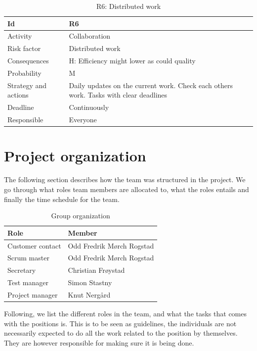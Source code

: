 \documentclass[11pt]{book}
\begin{document}
\begin{table}[H]
\centering
\begin{tabular}{ l  p{11cm} }
	Id						& R6 																		\\ \hline
	Activity				& Collaboration																		\\ \hline
	Risk factor				& Distributed work 															\\ \hline
	Consequences			& H: Efficiency might lower as could quality 								\\ \hline
	Probability				& M 																		\\ \hline
	Strategy and actions	& Daily updates on the current work. Check each others work. Tasks with 
								clear deadlines 														\\ \hline
	Deadline				& Continuously 																\\ \hline
	Responsible				& Everyone 																	\\ 
\end{tabular}
\label{tab:risk_6}
\caption{R6: Distributed work}
\end{table}

\section{Project organization}
The following section describes how the team was structured in the project. We go through what roles team members are allocated to, what the roles entails and finally the time schedule for the team.

\begin{table}[H]
\centering
	\begin{tabular}{ l  p{11cm}  } 	Role 				& Member 					\\ \hline
	Customer contact	& Odd Fredrik Mørch Rogstad \\ \hline
	Scrum master		& Odd Fredrik Mørch Rogstad \\ \hline
	Secretary			& Christian Frøystad 		\\ \hline
	Test manager		& Simon Stastny 			\\ \hline
	Project manager		& Knut Nergård 				\\
\end{tabular}
\label{tab:org}
\caption{Group organization}
\end{table}

Following, we list the different roles in the team, and what the tasks that comes with the positions is. This is to be seen as guidelines, the individuals are not necessarily expected to do all the work related to the position by themselves. They are however responsible for making sure it is being done.
\end{document}
